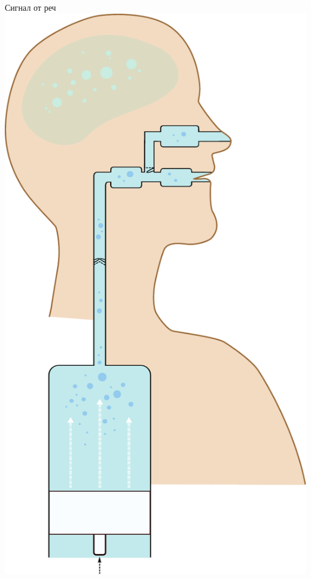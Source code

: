 \documentclass[9pt]{beamer}
\begin{document}
\begin{frame}{Сигнал от реч}
{        \includegraphics[width=0.28\paperwidth]{tubes}
    }
\end{frame}
\end{document}
